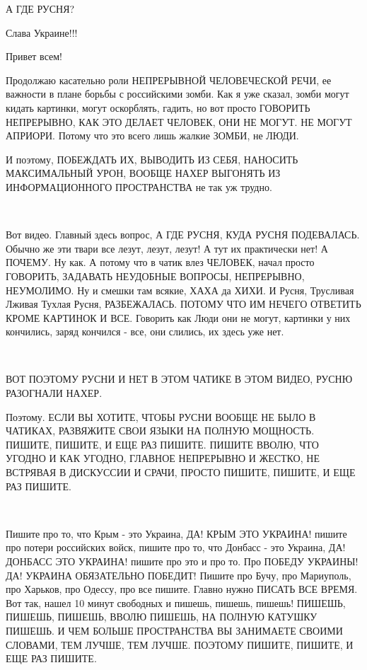  
 
 
 
 

А ГДЕ РУСНЯ?

Слава Украине!!! 💛 💙 💛 💙 💛 💙 💛 💙 💛

Привет всем!

Продолжаю касательно роли НЕПРЕРЫВНОЙ ЧЕЛОВЕЧЕСКОЙ РЕЧИ, ее важности в плане
борьбы с российскими зомби. Как я уже сказал, зомби могут кидать картинки,
могут оскорблять, гадить, но вот просто ГОВОРИТЬ НЕПРЕРЫВНО, КАК ЭТО ДЕЛАЕТ
ЧЕЛОВЕК, ОНИ НЕ МОГУТ.  НЕ МОГУТ АПРИОРИ. Потому что это всего лишь жалкие
ЗОМБИ, не ЛЮДИ.

И поэтому, ПОБЕЖДАТЬ ИХ, ВЫВОДИТЬ ИЗ СЕБЯ, НАНОСИТЬ МАКСИМАЛЬНЫЙ УРОН, ВООБЩЕ
НАХЕР ВЫГОНЯТЬ ИЗ ИНФОРМАЦИОННОГО ПРОСТРАНСТВА не так уж трудно.

💛 💙 💛 💙 💛 💙 💛 💙 💛 💙 💛 💙 💛 💙 💛 💙 💛 💙                  

Вот видео. Главный здесь вопрос, А ГДЕ РУСНЯ, КУДА РУСНЯ ПОДЕВАЛАСЬ. Обычно же
эти твари все лезут, лезут, лезут! А тут их практически нет! А ПОЧЕМУ.  Ну как.
А потому что в чатик влез ЧЕЛОВЕК, начал просто ГОВОРИТЬ, ЗАДАВАТЬ НЕУДОБНЫЕ
ВОПРОСЫ, НЕПРЕРЫВНО, НЕУМОЛИМО. Ну и смешки там всякие, ХАХА да ХИХИ.  И Русня,
Трусливая Лживая Тухлая Русня, РАЗБЕЖАЛАСЬ. ПОТОМУ ЧТО ИМ НЕЧЕГО ОТВЕТИТЬ КРОМЕ
КАРТИНОК И ВСЕ. Говорить как Люди они не могут, картинки у них кончились, заряд
кончился - все, они слились, их здесь уже нет.

💛 💙 💛 💙 💛 💙 💛 💙 💛 💙 💛 💙 💛 💙 💛 💙 💛 💙 💛 💙                    

ВОТ ПОЭТОМУ РУСНИ И НЕТ В ЭТОМ ЧАТИКЕ В ЭТОМ ВИДЕО, РУСНЮ РАЗОГНАЛИ НАХЕР. 

Поэтому. ЕСЛИ ВЫ ХОТИТЕ, ЧТОБЫ РУСНИ ВООБЩЕ НЕ БЫЛО В ЧАТИКАХ, РАЗВЯЖИТЕ СВОИ
ЯЗЫКИ НА ПОЛНУЮ МОЩНОСТЬ. ПИШИТЕ, ПИШИТЕ, И ЕЩЕ РАЗ ПИШИТЕ. ПИШИТЕ ВВОЛЮ, ЧТО
УГОДНО И КАК УГОДНО, ГЛАВНОЕ НЕПРЕРЫВНО И ЖЕСТКО, НЕ ВСТРЯВАЯ В ДИСКУССИИ И
СРАЧИ, ПРОСТО ПИШИТЕ, ПИШИТЕ, И ЕЩЕ РАЗ ПИШИТЕ.

💛 💙 💛 💙 💛 💙 💛 💙 💛 💙 💛 💙 💛 💙 💛 💙 💛 💙 💛 💙 💛                       

Пишите про то, что Крым - это Украина, ДА! КРЫМ ЭТО УКРАИНА! пишите про потери
российских войск, пишите про то, что Донбасс - это Украина, ДА! ДОНБАСС ЭТО
УКРАИНА! пишите про это и про то. Про ПОБЕДУ УКРАИНЫ! ДА! УКРАИНА ОБЯЗАТЕЛЬНО
ПОБЕДИТ! Пишите про Бучу, про Мариуполь, про Харьков, про Одессу, про все
пишите. Главно нужно ПИСАТЬ ВСЕ ВРЕМЯ. Вот так, нашел 10 минут свободных и
пишешь, пишешь, пишешь! ПИШЕШЬ, ПИШЕШЬ, ПИШЕШЬ, ВВОЛЮ ПИШЕШЬ, НА ПОЛНУЮ КАТУШКУ
ПИШЕШЬ.  И ЧЕМ БОЛЬШЕ ПРОСТРАНСТВА ВЫ ЗАНИМАЕТЕ СВОИМИ СЛОВАМИ, ТЕМ ЛУЧШЕ, ТЕМ
ЛУЧШЕ. ПОЭТОМУ ПИШИТЕ, ПИШИТЕ, И ЕЩЕ РАЗ ПИШИТЕ.

💛 💙 💛 💙 💛 💙 💛 💙 💛 💙 💛 💙 💛 💛 💙 💛 💙 💛 💙 💛 💙                       
